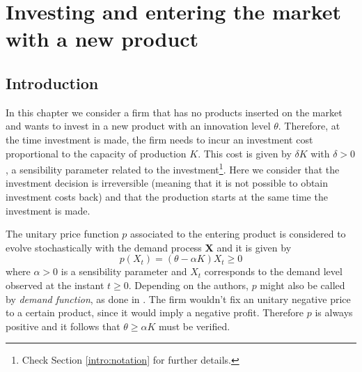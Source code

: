 


\chapter{Investing and entering the market with a new product}
\label{chapter:1}



\section{Introduction}
\label{section:overview}

In this chapter we consider a firm that has no products inserted on the market and wants to invest in a new product with an innovation level $\theta$. Therefore, at the time investment is made, the firm needs to incur an investment cost proportional to the capacity of production $K$. This cost is given by $\delta K$ with $\delta>0$, a sensibility parameter related to the investment\footnote{Check Section \ref{intro:notation} for further details.}. Here we consider that the investment decision is irreversible (meaning that it is not possible to obtain investment costs back) and that the production starts at the same time the investment is made.


The unitary price function $p$ associated to the entering product is considered to evolve stochastically with the demand process \textbf{X} and it is given by
\begin{equation}
p(X_t)=(\theta-\alpha K) X_t \geq 0
\label{prob1:p}
\end{equation}
where $\alpha>0$ is a sensibility parameter and $X_t$ corresponds to the demand level observed at the instant $t\geq0$. Depending on the authors, $p$ might also be called by \textit{demand function}, as done in \cite{rita}. The firm wouldn't fix an unitary negative price to a certain product, since it would imply a negative profit. Therefore $p$ is always positive and it follows that $\theta \geq \alpha K$ must be verified.

